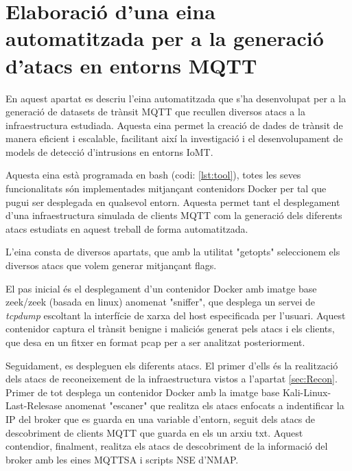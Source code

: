 \chapter{Elaboració d'una eina automatitzada per a la generació d'atacs en entorns MQTT}
\label{sec:tool}
En aquest apartat es descriu l'eina automatitzada que s'ha desenvolupat per a la generació de datasets de trànsit MQTT que recullen diversos atacs a la infraestructura estudiada. Aquesta eina permet la creació de dades de trànsit de manera eficient i escalable, facilitant així la investigació i el desenvolupament de models de detecció d'intrusions en entorns IoMT.

Aquesta eina està programada en bash (codi: \ref{lst:tool}), totes les seves funcionalitats són implementades mitjançant contenidors Docker per tal que pugui ser desplegada en qualsevol entorn. Aquesta permet tant el desplegament d'una infraestructura simulada de clients MQTT com la generació dels diferents atacs estudiats en aquest treball de forma automatitzada.

L'eina consta de diversos apartats, que amb la utilitat "getopts" seleccionem els diversos atacs que volem generar mitjançant flags.

El pas inicial és el desplegament d'un contenidor Docker amb imatge base zeek/zeek (basada en linux) \cite{zeekimg} anomenat "sniffer", que desplega un servei de \textit{tcpdump} escoltant la interfície de xarxa del host especificada per l'usuari. Aquest contenidor captura el trànsit benigne i maliciós generat pels atacs i els clients, que desa en un fitxer en format pcap per a ser analitzat posteriorment.

Seguidament, es despleguen els diferents atacs. El primer d'ells és la realització dels atacs de reconeixement de la infraestructura vistos a l'apartat \ref{sec:Recon}. Primer de tot desplega un contenidor Docker amb la imatge base Kali-Linux-Last-Relesase anomenat "escaner" que realitza els atacs enfocats a indentificar la IP del broker que es guarda en una variable d'entorn, seguit dels atacs de descobriment de clients MQTT que guarda en els un arxiu txt. Aquest contendior, finalment, realitza els atacs de descobriment de la informació del broker amb les eines MQTTSA i scripts NSE d'NMAP.

